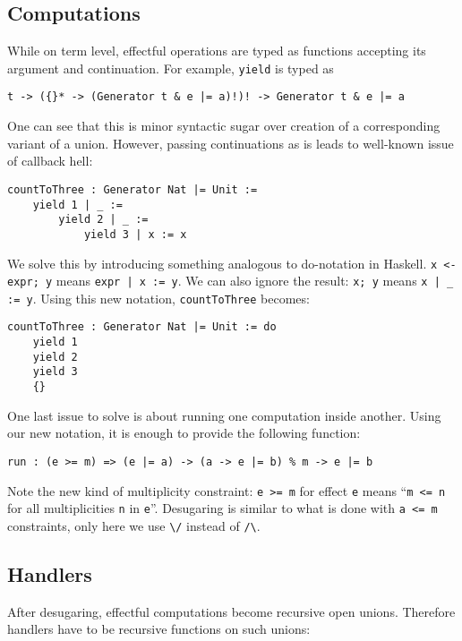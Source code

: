 \documentclass[a4paper,14pt]{extreport}
\begin{document}
\subsection{Computations}

While on term level, effectful operations are typed as functions accepting its
argument and continuation. For example, \verb|yield| is typed as

\begin{verbatim}
t -> ({}* -> (Generator t & e |= a)!)! -> Generator t & e |= a
\end{verbatim}

One can see that this is minor syntactic sugar over creation of a corresponding
variant of a union. However, passing continuations as is leads to well-known
issue of callback hell:

\begin{verbatim}
countToThree : Generator Nat |= Unit :=
    yield 1 | _ :=
        yield 2 | _ :=
            yield 3 | x := x
\end{verbatim}

We solve this by introducing something analogous to do-notation in Haskell.
\verb|x <- expr; y| means \verb+expr | x := y+. We can also ignore the result:
\verb|x; y| means \verb+x | _ := y+. Using this new notation,
\verb|countToThree| becomes:

\begin{verbatim}
countToThree : Generator Nat |= Unit := do
    yield 1
    yield 2
    yield 3
    {}
\end{verbatim}

One last issue to solve is about running one computation inside another. Using
our new notation, it is enough to provide the following function:

\begin{verbatim}
run : (e >= m) => (e |= a) -> (a -> e |= b) % m -> e |= b
\end{verbatim}

Note the new kind of multiplicity constraint: \verb|e >= m| for effect \verb|e|
means ``\verb|m <= n| for all multiplicities \verb|n| in \verb|e|''. Desugaring
is similar to what is done with \verb|a <= m| constraints, only here we use
\verb|\/| instead of \verb|/\|.

\subsection{Handlers}

After desugaring, effectful computations become recursive open unions. Therefore
handlers have to be recursive functions on such unions:
\end{document}

